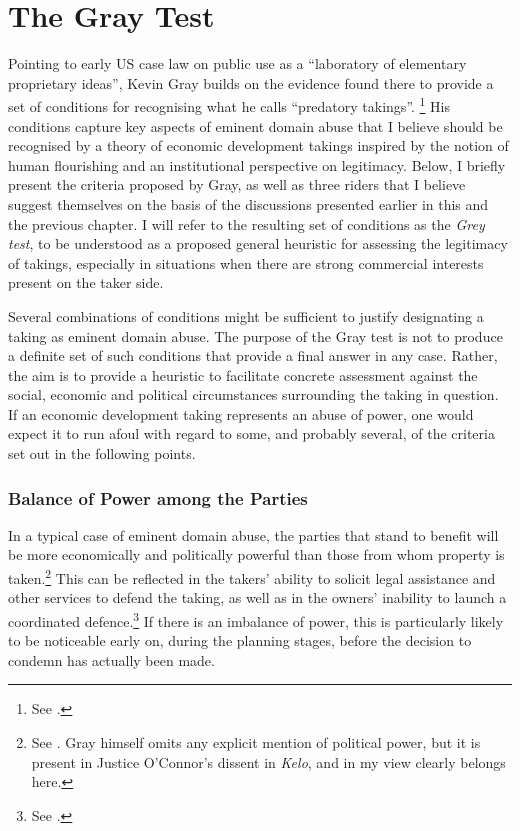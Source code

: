 \section{The Gray Test}\label{sec:gt}

Pointing to early US case law on public use as a ``laboratory of elementary proprietary ideas'', Kevin Gray builds on the evidence found there to provide a set of conditions for recognising what he calls ``predatory takings''. \footnote{See \cite[28-30]{gray11}.} His conditions capture key aspects of eminent domain abuse that I believe should be recognised by a theory of economic development takings inspired by the notion of human flourishing and an institutional perspective on legitimacy. Below, I briefly present the criteria proposed by Gray, as well as three riders that I believe suggest themselves on the basis of the discussions presented earlier in this and the previous chapter. I will refer to the resulting set of conditions as the {\it Grey test}, to be understood as a proposed general heuristic for assessing the legitimacy of takings, especially in situations when there are strong commercial interests present on the taker side. %

Several combinations of conditions might be sufficient to justify designating a taking as eminent domain abuse. The purpose of the Gray test is not to produce a definite set of such conditions that provide a final answer in any case. Rather, the aim is to provide a heuristic to facilitate concrete assessment against the social, economic and political circumstances surrounding the taking in question. If an economic development taking represents an abuse of power, one would expect it to run afoul with regard to some, and probably several, of the criteria set out in the following points.

\subsubsection*{Balance of Power among the Parties}

In a typical case of eminent domain abuse, the parties that stand to benefit will be more economically and politically powerful than those from whom property is taken.\footnote{See \cite[30-31]{gray11}. Gray himself omits any explicit mention of political power, but it is present in Justice O'Connor's dissent in {\it Kelo}, and in my view clearly belongs here.} This can be reflected in the takers' ability to solicit legal assistance and other services to defend the taking, as well as in the  owners' inability to launch a coordinated defence.\footnote{See \cite[30-31]{gray11}.} If there is an imbalance of power, this is particularly likely to be noticeable early on, during the planning stages, before the decision to condemn has actually been made. 

